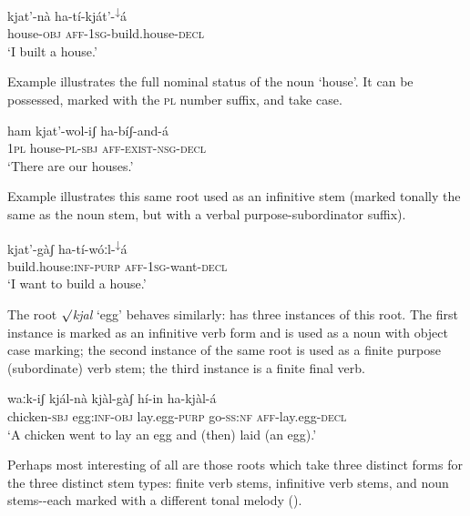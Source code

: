 \documentclass[output=paper]{langsci/langscibook}
\begin{document}
\ea\label{ex:mahland:16}
\gll kjat'-n\`{a}       ha-t\'{i}-kj\'{a}t'-\textsuperscript{↓}\'{a}\\
house\textsc{{}-obj}   \textsc{aff-1sg}{}-build.house\textsc{{}-decl }\\
\glt `I built a house.'
\z

Example  illustrates the full nominal status of the noun `house'. It can be possessed, marked with the \textsc{pl} number suffix, and take case. 

\ex\label{ex:mahland:17}
\gll ham   kjat'-wol-iʃ       ha-b\'{i}ʃ-and-\'{a}\\
\textsc{1pl}    house-\textsc{pl-sbj}    \textsc{aff-exist-nsg-decl} \\
\glt `There are our houses.'
\z

Example  illustrates this same root used as an infinitive stem (marked tonally the same as the noun stem, but with a verbal purpose-subordinator suffix).

\ea\label{ex:mahland:18}
\gll kjat'-g\`{a}ʃ                    ha-t\'{i}-w\'{o}ːl-\textsuperscript{↓}\'{a}\\
build.house:\textsc{inf-purp}   \textsc{aff-1sg}{}-want-\textsc{decl }\\
\glt `I want to build a house.'
\z

The root \textit{${\surd}$kjal} `egg' behaves similarly:  has three instances of this root. The first instance is marked as an infinitive verb form and is used as a noun with object case marking; the second instance of the same root is used as a finite purpose (subordinate) verb stem; the third instance is a finite final verb. 

\ea\label{ex:mahland:19}
\gll waːk-iʃ          kj\'{a}l-n\`{a}         kj\`{a}l-g\`{a}ʃ         h\'{i}-in    ha-kj\`{a}l-\'{a}
   \\
chicken-\textsc{sbj}   egg:\textsc{inf-obj}   lay.egg\textsc{{}-purp}  go\textsc{{}-ss:nf} \textsc{aff}{}-lay.egg-\textsc{decl} \\
\glt `A chicken went to lay an egg and (then) laid (an egg).'
\z

Perhaps most interesting of all are those roots which take three distinct forms for the three distinct stem types: finite verb stems, infinitive verb stems, and noun stems-{}-each marked with a different tonal melody ().
\end{document}
